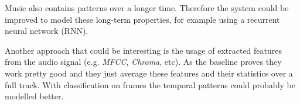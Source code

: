 \documentclass[11pt, twocolumn]{article}
\begin{document}
Music also contains patterns over a longer time. Therefore the system could be improved to model these long-term properties, for example using a recurrent neural network (RNN). 

Another approach that could be interesting is the usage of extracted features from the audio signal (e.g. \textit{MFCC}, \textit{Chroma}, etc). As the baseline proves they work pretty good and they just average these features and their statistics over a full track. With classification on frames the temporal patterns could probably be modelled better.



\end{document}
